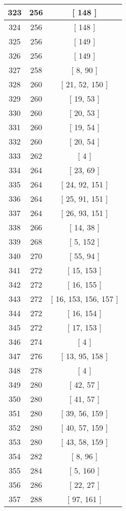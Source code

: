 \begin{center}
\begin{longtable}[H]{|| c c c ||}
\hline
323 & 256 & [ 148 ] \\ 
\hline
324 & 256 & [ 148 ] \\ 
\hline
325 & 256 & [ 149 ] \\ 
\hline
326 & 256 & [ 149 ] \\ 
\hline
327 & 258 & [ 8, 90 ] \\ 
\hline
328 & 260 & [ 21, 52, 150 ] \\ 
\hline
329 & 260 & [ 19, 53 ] \\ 
\hline
330 & 260 & [ 20, 53 ] \\ 
\hline
331 & 260 & [ 19, 54 ] \\ 
\hline
332 & 260 & [ 20, 54 ] \\ 
\hline
333 & 262 & [ 4 ] \\ 
\hline
334 & 264 & [ 23, 69 ] \\ 
\hline
335 & 264 & [ 24, 92, 151 ] \\ 
\hline
336 & 264 & [ 25, 91, 151 ] \\ 
\hline
337 & 264 & [ 26, 93, 151 ] \\ 
\hline
338 & 266 & [ 14, 38 ] \\ 
\hline
339 & 268 & [ 5, 152 ] \\ 
\hline
340 & 270 & [ 55, 94 ] \\ 
\hline
341 & 272 & [ 15, 153 ] \\ 
\hline
342 & 272 & [ 16, 155 ] \\ 
\hline
343 & 272 & [ 16, 153, 156, 157 ] \\ 
\hline
344 & 272 & [ 16, 154 ] \\ 
\hline
345 & 272 & [ 17, 153 ] \\ 
\hline
346 & 274 & [ 4 ] \\ 
\hline
347 & 276 & [ 13, 95, 158 ] \\ 
\hline
348 & 278 & [ 4 ] \\ 
\hline
349 & 280 & [ 42, 57 ] \\ 
\hline
350 & 280 & [ 41, 57 ] \\ 
\hline
351 & 280 & [ 39, 56, 159 ] \\ 
\hline
352 & 280 & [ 40, 57, 159 ] \\ 
\hline
353 & 280 & [ 43, 58, 159 ] \\ 
\hline
354 & 282 & [ 8, 96 ] \\ 
\hline
355 & 284 & [ 5, 160 ] \\ 
\hline
356 & 286 & [ 22, 27 ] \\ 
\hline
357 & 288 & [ 97, 161 ] \\ 

\end{longtable}
\end{center}

